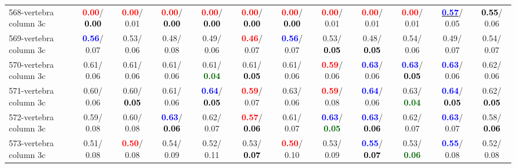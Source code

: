 \begin{table}[h]
\begin{center}
{\begin{tabular}{lc|c|c|c|c|c|c|c|c|c|c}
568-vertebra column 3c & \textcolor{red}{\textbf{  0.00}}/\textcolor{black}{\textbf{  0.00}} & \textcolor{red}{\textbf{  0.00}}/  0.01 & \textcolor{red}{\textbf{  0.00}}/\textcolor{black}{\textbf{  0.00}} & \textcolor{red}{\textbf{  0.00}}/\textcolor{black}{\textbf{  0.00}} & \textcolor{red}{\textbf{  0.00}}/\textcolor{black}{\textbf{  0.00}} & \textcolor{red}{\textbf{  0.00}}/\textcolor{black}{\textbf{  0.00}} & \textcolor{red}{\textbf{  0.00}}/  0.01 & \textcolor{red}{\textbf{  0.00}}/  0.01 & \textcolor{red}{\textbf{  0.00}}/  0.01 & \underline{\textcolor{blue}{\textbf{  0.57}}}/  0.05 & \textcolor{black}{\textbf{  0.55}}/  0.06 \\
569-vertebra column 3c & \textcolor{blue}{\textbf{  0.56}}/  0.07 &   0.53/  0.06 &   0.48/  0.08 &   0.49/  0.06 & \textcolor{red}{\textbf{  0.46}}/  0.07 & \textcolor{blue}{\textbf{  0.56}}/  0.07 &   0.53/\textcolor{black}{\textbf{  0.05}} &   0.48/\textcolor{black}{\textbf{  0.05}} &   0.54/  0.06 &   0.49/  0.07 &   0.54/  0.07 \\
570-vertebra column 3c &   0.61/  0.06 &   0.61/  0.06 &   0.61/  0.06 &   0.61/\textcolor{darkgreen}{\textbf{  0.04}} &   0.61/\textcolor{black}{\textbf{  0.05}} &   0.61/  0.06 & \textcolor{red}{\textbf{  0.59}}/  0.06 & \textcolor{blue}{\textbf{  0.63}}/  0.06 & \textcolor{blue}{\textbf{  0.63}}/\textcolor{black}{\textbf{  0.05}} & \textcolor{blue}{\textbf{  0.63}}/  0.06 &   0.62/  0.06 \\
571-vertebra column 3c &   0.60/  0.06 &   0.60/\textcolor{black}{\textbf{  0.05}} &   0.61/  0.06 & \textcolor{blue}{\textbf{  0.64}}/\textcolor{black}{\textbf{  0.05}} & \textcolor{red}{\textbf{  0.59}}/  0.07 &   0.63/  0.06 & \textcolor{red}{\textbf{  0.59}}/  0.08 & \textcolor{blue}{\textbf{  0.64}}/  0.06 &   0.63/\textcolor{darkgreen}{\textbf{  0.04}} & \textcolor{blue}{\textbf{  0.64}}/\textcolor{black}{\textbf{  0.05}} &   0.62/\textcolor{black}{\textbf{  0.05}} \\
572-vertebra column 3c &   0.59/  0.08 &   0.60/  0.08 & \textcolor{blue}{\textbf{  0.63}}/\textcolor{black}{\textbf{  0.06}} &   0.62/  0.07 & \textcolor{red}{\textbf{  0.57}}/\textcolor{black}{\textbf{  0.06}} &   0.61/  0.07 & \textcolor{blue}{\textbf{  0.63}}/\textcolor{darkgreen}{\textbf{  0.05}} & \textcolor{blue}{\textbf{  0.63}}/\textcolor{black}{\textbf{  0.06}} &   0.62/  0.07 & \textcolor{blue}{\textbf{  0.63}}/  0.07 &   0.58/\textcolor{black}{\textbf{  0.06}} \\ \hline
573-vertebra column 3c &   0.51/  0.08 & \textcolor{red}{\textbf{  0.50}}/  0.08 &   0.54/  0.09 &   0.52/  0.11 &   0.53/\textcolor{black}{\textbf{  0.07}} & \textcolor{red}{\textbf{  0.50}}/  0.10 &   0.53/  0.09 & \textcolor{blue}{\textbf{  0.55}}/\textcolor{black}{\textbf{  0.07}} &   0.53/\textcolor{darkgreen}{\textbf{  0.06}} & \textcolor{blue}{\textbf{  0.55}}/  0.08 &   0.52/  0.08 \\

\end{tabular}}
\end{center}
\end{table}
